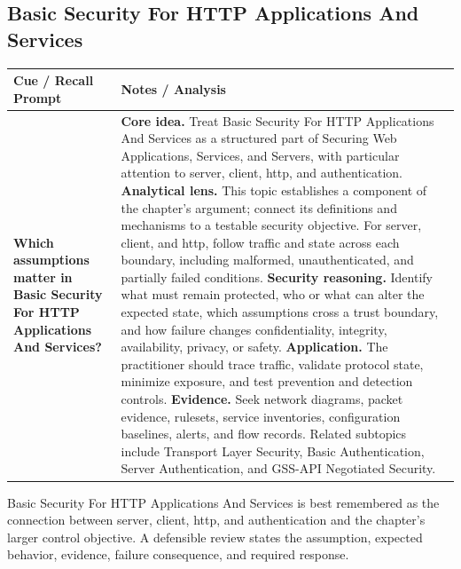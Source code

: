 \documentclass[11pt]{article}
\newcommand{\CornellHeader}{%
\rowcolor{Navy}\color{white}\bfseries Cue / Recall Prompt & \color{white}\bfseries Notes / Analysis\\\hline}
\newcommand{\CornellRow}[2]{%
\cellcolor{CueGray}\RaggedRight\textbf{#1} & \RaggedRight #2\\\hline}
\begin{document}
\subsection*{Basic Security For HTTP Applications And Services}
\begin{longtable}{>{\RaggedRight\arraybackslash}p{}|>{\RaggedRight\arraybackslash}p{}}
\CornellHeader
\CornellRow{Which assumptions matter in Basic Security For HTTP Applications And Services?}{\textbf{Core idea.} Treat Basic Security For HTTP Applications And Services as a structured part of Securing Web Applications, Services, and Servers, with particular attention to server, client, http, and authentication. \textbf{Analytical lens.} This topic establishes a component of the chapter's argument; connect its definitions and mechanisms to a testable security objective. For server, client, and http, follow traffic and state across each boundary, including malformed, unauthenticated, and partially failed conditions. \textbf{Security reasoning.} Identify what must remain protected, who or what can alter the expected state, which assumptions cross a trust boundary, and how failure changes confidentiality, integrity, availability, privacy, or safety. \textbf{Application.} The practitioner should trace traffic, validate protocol state, minimize exposure, and test prevention and detection controls. \textbf{Evidence.} Seek network diagrams, packet evidence, rulesets, service inventories, configuration baselines, alerts, and flow records. Related subtopics include Transport Layer Security, Basic Authentication, Server Authentication, and GSS-API Negotiated Security.}
\end{longtable}
\begin{topicsummary}
Basic Security For HTTP Applications And Services is best remembered as the connection between server, client, http, and authentication and the chapter's larger control objective. A defensible review states the assumption, expected behavior, evidence, failure consequence, and required response.
\end{topicsummary}
\end{document}

